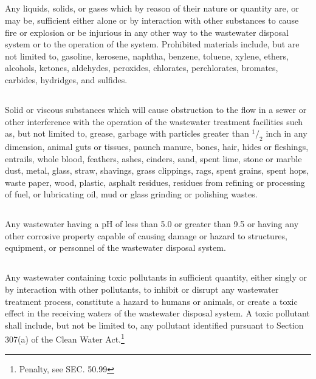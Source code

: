 \subsection{}
Any liquids, solids, or gases which by reason of their nature or quantity are, or may be, sufficient either alone or by interaction with other substances to cause fire or explosion or be injurious in any other way to the wastewater disposal system or to the operation of the system.  Prohibited materials include, but are not limited to, gasoline, kerosene, naphtha, benzene, toluene, xylene, ethers, alcohols, ketones, aldehydes, peroxides, chlorates, perchlorates, bromates, carbides, hydridges, and sulfides.
\subsection{}
Solid or viscous substances which will cause obstruction to the flow in a sewer or other interference with the operation of the wastewater treatment facilities such as, but not limited to, grease, garbage with particles greater than ${^1/_2}$ inch in any dimension, animal guts or tissues, paunch manure, bones, hair, hides or fleshings, entrails, whole blood, feathers, ashes, cinders, sand, spent lime, stone or marble dust, metal, glass, straw, shavings, grass clippings, rags, spent grains, spent hops, waste paper, wood, plastic, asphalt residues, residues from refining or processing of fuel, or lubricating oil, mud or glass grinding or polishing wastes.
\subsection{}
Any wastewater having a pH of less than 5.0 or greater than 9.5 or having any other corrosive property capable of causing damage or hazard to structures, equipment, or personnel of the wastewater disposal system.
\subsection{}
Any wastewater containing toxic pollutants in sufficient quantity, either singly or by interaction with other pollutants, to inhibit or disrupt any wastewater treatment process, constitute a hazard to humans or animals, or create a toxic effect in the receiving waters of the wastewater disposal system.  A toxic pollutant shall include, but not be limited to, any pollutant identified pursuant to Section 307(a) of the Clean Water Act.\footnote{Penalty, see SEC. 50.99}

